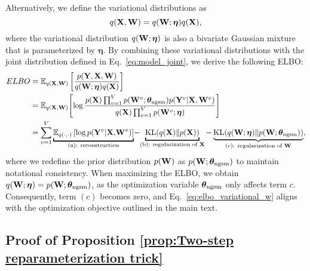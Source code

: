 Alternatively, we define the variational distributions as 
$$q({\mathbf X},{\mathbf W}) = q({\mathbf W};\boldsymbol{\eta})q({\mathbf X}),$$
where the variational distribution $q({\mathbf W}; \boldsymbol{\eta})$ is also a bivariate Gaussian mixture that is parameterized by \(\bm{\eta}\). By combining these variational distributions with the joint distribution defined in Eq.~\eqref{eq:model_joint}, we derive the following \MakeUppercase{elbo}: 
\begin{align}
    \MakeUppercase{elbo} & = \mathbb{E}_{q(\vx,\vw)} \left[ \frac{p(\vy, \vx , \vw )}{q(\vw;\bm{\eta})q(\vx)}\right] \nonumber \\
            & = \mathbb{E}_{q(\vx, \vw)} \! \left[\log \frac{p(\vx) \prod_{v=1}^{V} p(\vw^v;\bm{\theta}_{\text{ngsm}}) p(\vy^v \vert \vx, \vw^v)}{q(\vx)\prod_{v=1}^{V} p(\vw^v;\bm{\eta})} \right] \nonumber \\ 
            & = \sum_{v=1}^V \underbracket{\mathbb{E}_{q(\cdot, \cdot)} \left[ \log p(\vy^v \vert \vx,\!\vw^v) \right]}_{\text{(a): reconstruction}}\!-\!\underbracket{ \operatorname{KL}(q(\vx) \| p(\vx))}_{\text{(b): regularization of $\vx$}} -\underbrace{ \operatorname{KL}(q(\vw;\bm{\eta}) \| p(\vw;\btheta_{\text{ngsm}}))}_{\text{(c): regularization of $\vw$}},  
            \label{eq:elbo_variational_w}
\end{align}
where we redefine the prior distribution $p({\mathbf W})$ as $p({\mathbf W};\boldsymbol{\theta}_{\text{ngsm}})$ to maintain notational consistency. 
When maximizing the \MakeUppercase{elbo}, we obtain \( q({\mathbf W}; \boldsymbol{\eta}) = p({\mathbf W}; {{\boldsymbol{\theta}}}_{\text{ngsm}}) \), as the optimization variable \({{\boldsymbol{\theta}}}_{\text{ngsm}}\) only affects term \(c\). Consequently, term \((c)\) becomes zero, and Eq.~\eqref{eq:elbo_variational_w} aligns with the optimization objective outlined in the main text. 



\subsection{Proof of Proposition \ref{prop:Two-step reparameterization trick}}
\label{app:proposition_1}


